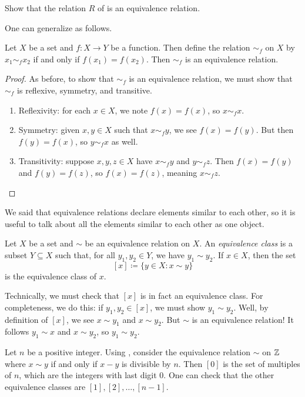 \documentclass[../main.tex]{subfiles}
\begin{document}
\begin{exe}
    Show that the relation $R$ of  is an equivalence relation.
\end{exe}
One can generalize  as follows.
\begin{proposition} \label{prop:function-to-equiv}
    Let $X$ be a set and $f\colon X\to Y$ be a function. Then define the relation $\sim_f$ on $X$ by $x_1\sim_f x_2$ if and only if $f(x_1)=f(x_2)$. Then $\sim_f$ is an equivalence relation.
\end{proposition}
\begin{proof}
    As before, to show that $\sim_f$ is an equivalence relation, we must show that $\sim_f$ is reflexive, symmetry, and transitive.
    \begin{enumerate}[label=(\alph*)]
        \item Reflexivity: for each $x\in X$, we note $f(x)=f(x)$, so $x\sim_fx$.
        \item Symmetry: given $x,y\in X$ such that $x\sim_fy$, we see $f(x)=f(y)$. But then $f(y)=f(x)$, so $y\sim_fx$ as well.
        \item Transitivity: suppose $x,y,z\in X$ have $x\sim_fy$ and $y\sim_fz$. Then $f(x)=f(y)$ and $f(y)=f(z)$, so $f(x)=f(z)$, meaning $x\sim_fz$.
        \qedhere
    \end{enumerate}
\end{proof}
We said that equivalence relations declare elements similar to each other, so it is useful to talk about all the elements similar to each other as one object.
\begin{definition}
    Let $X$ be a set and $\sim$ be an equivalence relation on $X$. An \emph{equivalence class} is a subset $Y\subseteq X$ such that, for all $y_1, y_2 \in Y$, we have $y_1 \sim y_2$. If $x \in X$, then the set
    \[[x] \coloneqq \{y \in X : x \sim y\}\]
    is the equivalence class of $x$.
\end{definition}
\begin{remark}
    Technically, we must check that $[x]$ is in fact an equivalence class. For completeness, we do this: if $y_1,y_2\in[x]$, we must show $y_1\sim y_2$. Well, by definition of $[x]$, we see $x\sim y_1$ and $x\sim y_2$. But $\sim$ is an equivalence relation! It follows $y_1\sim x$ and $x\sim y_2$, so $y_1\sim y_2$.
\end{remark}
\begin{example}
    Let $n$ be a positive integer. Using , consider the equivalence relation $\sim$ on $\mathbb Z$ where $x \sim y$ if and only if $x-y$ is divisible by $n$. Then $[0]$ is the set of multiples of $n$, which are the integers with last digit $0$. One can check that the other equivalence classes are $[1], [2], \ldots, [n - 1]$.
\end{example}
\end{document}
